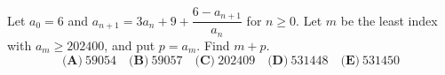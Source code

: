Let $a_0=6$ and $a_{n+1}=3a_n+9+\dfrac{6-a_{n+1}}{a_n}$ for $n\ge0$. Let $m$ be the least index with $a_m\ge202400$, and put $p=a_m$. Find $m+p$.
\[\textbf{(A)}~59054\quad\textbf{(B)}~59057\quad\textbf{(C)}~202409\quad\textbf{(D)}~531448\quad\textbf{(E)}~531450\]
